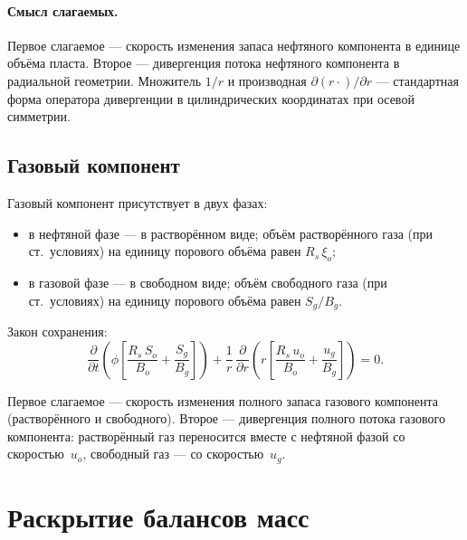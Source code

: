 \documentclass[12pt,a4paper]{article}
\begin{document}
\paragraph{Смысл слагаемых.}
Первое слагаемое --- скорость изменения запаса нефтяного компонента
в единице объёма пласта. Второе --- дивергенция потока нефтяного компонента
в радиальной геометрии. Множитель $1/r$ и производная $\partial(r\cdot)/\partial r$
--- стандартная форма оператора дивергенции в цилиндрических координатах
при осевой симметрии.

\subsection{Газовый компонент}\label{ssec:mass_gas}

Газовый компонент присутствует в двух фазах:
\begin{itemize}[nosep]
  \item в нефтяной фазе --- в растворённом виде; объём растворённого газа
        (при ст.~условиях) на единицу порового объёма равен $R_s\,\xi_o$;
  \item в газовой фазе --- в свободном виде; объём свободного газа (при
        ст.~условиях) на единицу порового объёма равен $S_g/B_g$.
\end{itemize}

Закон сохранения:
\begin{equation}\label{eq:mass_gas}
  \boxed{
    \frac{\partial}{\partial t}\!\left(\phi\!\left[
      \frac{R_s\,S_o}{B_o} + \frac{S_g}{B_g}
    \right]\right)
    + \frac{1}{r}\,\frac{\partial}{\partial r}\!\left(r\!\left[
      \frac{R_s\,u_o}{B_o} + \frac{u_g}{B_g}
    \right]\right) = 0.
  }
\end{equation}

Первое слагаемое --- скорость изменения полного запаса газового компонента
(растворённого и свободного). Второе --- дивергенция полного потока газового
компонента: растворённый газ переносится вместе с нефтяной фазой со
скоростью~$u_o$, свободный газ --- со скоростью~$u_g$.


\section{Раскрытие балансов масс}\label{sec:mass_expand}
\end{document}
